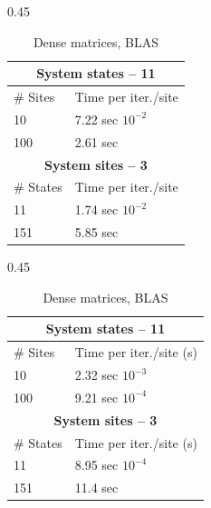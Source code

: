\documentclass[final]{beamer}
\newlength{\onecolwid}
\newlength{\twocolwid}
\begin{document}
\begin{frame}[t]
\begin{columns}[t]
\begin{column}{\twocolwid}
\begin{columns}[t,totalwidth=\twocolwid]
\begin{column}{\onecolwid}\vspace{-.6in} %


\begin{table}[h!]
\centering
\caption{CCC Computation time comparison for periodic system. ($g = 0.2$).}
\label{tab:system_times_non_periodic}
\vspace{-2em}

    \begin{subtable}[t]{0.45\textwidth}
    \centering
    \caption{Sparse matrices}
        \begin{tabular}{@{}ll@{}}
        \toprule
        \multicolumn{2}{c}{\textbf{System states – 11 }} \\
        \midrule
        \# Sites & Time per iter./site \\
        \midrule
        10  & 7.22 sec $10^{-2}$ \\
        100 & 2.61 sec \\
        \midrule
        \multicolumn{2}{c}{\textbf{System sites – 3 }} \\
        \midrule
        \# States & Time per iter./site \\
        \midrule
        11  & 1.74 sec $10^{-2}$ \\
        151 & 5.85 sec \\
        \bottomrule
        \end{tabular}
    \end{subtable}
\hfill
    \begin{subtable}[t]{0.45\textwidth}
    \centering
    \caption{Dense matrices, BLAS}
        \begin{tabular}{@{}ll@{}}
        \toprule
        \multicolumn{2}{c}{\textbf{System states – 11 }} \\
        \midrule
        \# Sites & Time per iter./site (s) \\
        \midrule
        10  & 2.32 sec $10^{-3}$ \\
        100 & 9.21 sec $10^{-4}$ \\
        \midrule
        \multicolumn{2}{c}{\textbf{System sites – 3 }} \\
        \midrule
        \# States & Time per iter./site (s) \\
        \midrule
        11  & 8.95 sec $10^{-4}$ \\
        151 & 11.4 sec \\
        \bottomrule
        \end{tabular}
    \end{subtable}
\end{table}


\end{column}
\end{columns}
\end{column}
\end{columns}
\end{frame}
\end{document}
